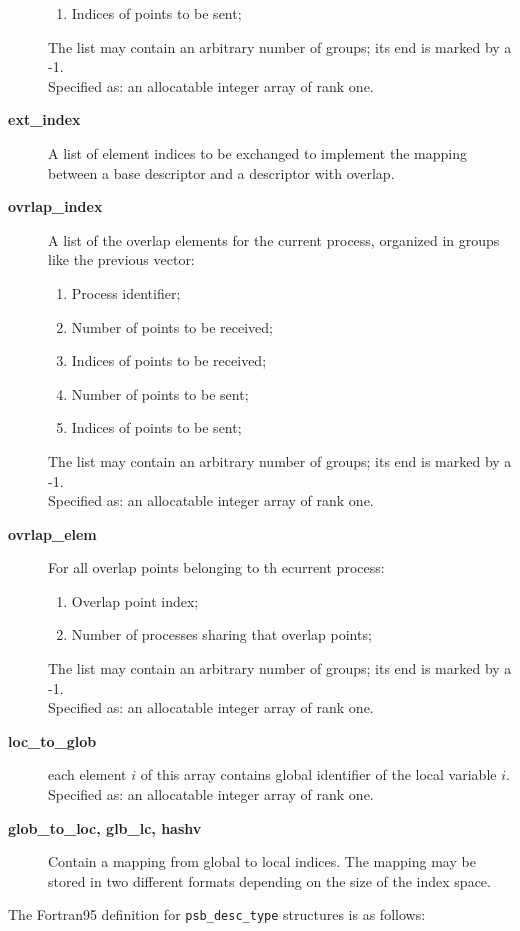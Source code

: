 \begin{description}
\begin{enumerate}
\item Indices of points to be sent;
\end{enumerate}
The list may contain an arbitrary number of groups; its end is marked
by a -1.\\
Specified as: an allocatable integer array of rank one.
\item[{\bf ext\_index}] A list of element indices to be exchanged to
  implement the mapping between a base descriptor and a descriptor
  with overlap. 
\item [{\bf ovrlap\_index}] A list of the overlap elements for the
current process, organized in groups like the previous vector:
\begin{enumerate}
\item Process identifier;
\item Number of points to be received;
\item Indices of points to be received;
\item Number of points to be sent;
\item Indices of points to be sent;
\end{enumerate}
The list may contain an arbitrary number of groups; its end is marked
by a -1.\\
Specified as: an allocatable integer array  of rank one.
\item [{\bf ovrlap\_elem}] For all overlap points belonging to th
ecurrent process:
\begin{enumerate}
\item  Overlap point index;
\item  Number of processes sharing that overlap points;
\end{enumerate}
The list may contain an arbitrary number of groups; its end is marked
by a -1.\\
Specified as: an allocatable integer array of rank one.
\item[{\bf loc\_to\_glob}] each element $i$ of this array contains
global identifier of the local variable $i$.\\
Specified as: an allocatable integer array of rank one.
\item[{\bf glob\_to\_loc, glb\_lc, hashv}] Contain a mapping from
  global to local indices. The mapping may be stored in two different
  formats depending on the size of the index space. 
\end{description}
The Fortran95 definition  for \verb|psb_desc_type| structures is 
as follows:
